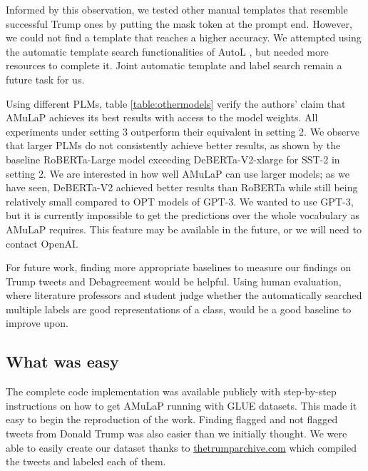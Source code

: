 \hfill \break
Informed by this observation, we tested other manual templates that resemble successful Trump ones by putting the mask token at the prompt end. However, we could not find a template that reaches a higher accuracy. We attempted using the automatic template search functionalities of AutoL \citep{gao-etal-2021-making}, but needed more resources to complete it. Joint automatic template and label search remain a future task for us. 

\hfill \break
Using different PLMs, table \ref{table:othermodels} verify the authors' claim that AMuLaP achieves its best results with access to the model weights. All experiments under setting 3 outperform their equivalent in setting 2. We observe that larger PLMs do not consistently achieve better results, as shown by the baseline RoBERTa-Large model exceeding DeBERTa-V2-xlarge for SST-2 in setting 2. We are interested in how well AMuLaP can use larger models; as we have seen, DeBERTa-V2 achieved better results than RoBERTa while still being relatively small compared to OPT models of GPT-3. We wanted to use GPT-3, but it is currently impossible to get the predictions over the whole vocabulary as AMuLaP requires. This feature may be available in the future, or we will need to contact OpenAI.

\hfill \break
For future work, finding more appropriate baselines to measure our findings on Trump tweets and Debagreement would be helpful. Using human evaluation, where literature professors and student judge whether the automatically searched multiple labels are good representations of a class, would be a good baseline to improve upon.

\subsection{What was easy}

The complete code implementation was available publicly with step-by-step instructions on how to get AMuLaP running with GLUE datasets. This made it easy to begin the reproduction of the work. Finding flagged and not flagged tweets from Donald Trump was also easier than we initially thought. We were able to easily create our dataset thanks to \url{thetrumparchive.com} which
compiled the tweets and labeled each of them.

